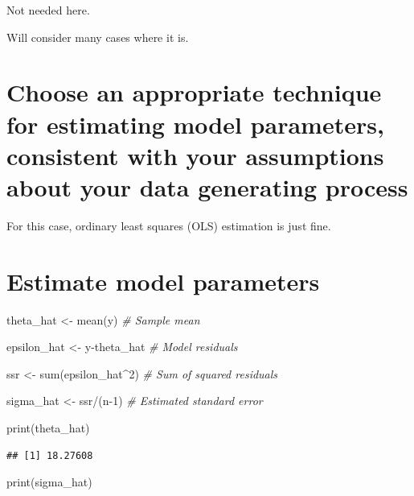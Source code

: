 \documentclass[
]{book}
\newenvironment{Shaded}{\begin{snugshade}}{\end{snugshade}}
\newcommand{\CommentTok}[1]{\textcolor[rgb]{0.56,0.35,0.01}{\textit{#1}}}
\newcommand{\DecValTok}[1]{\textcolor[rgb]{0.00,0.00,0.81}{#1}}
\newcommand{\FunctionTok}[1]{\textcolor[rgb]{0.00,0.00,0.00}{#1}}
\newcommand{\NormalTok}[1]{#1}
\newcommand{\OtherTok}[1]{\textcolor[rgb]{0.56,0.35,0.01}{#1}}
\newcommand{\SpecialCharTok}[1]{\textcolor[rgb]{0.00,0.00,0.00}{#1}}
\begin{document}
Not needed here.

Will consider many cases where it is.

\hypertarget{choose-an-appropriate-technique-for-estimating-model-parameters-consistent-with-your-assumptions-about-your-data-generating-process}{%
\section{Choose an appropriate technique for estimating model parameters, consistent with your assumptions about your data generating process}\label{choose-an-appropriate-technique-for-estimating-model-parameters-consistent-with-your-assumptions-about-your-data-generating-process}}

For this case, ordinary least squares (OLS) estimation is just fine.

\hypertarget{estimate-model-parameters}{%
\section{Estimate model parameters}\label{estimate-model-parameters}}

\begin{Shaded}
\begin{Highlighting}[]
\NormalTok{theta\_hat }\OtherTok{\textless{}{-}} \FunctionTok{mean}\NormalTok{(y)         }\CommentTok{\# Sample mean}

\NormalTok{epsilon\_hat }\OtherTok{\textless{}{-}}\NormalTok{ y}\SpecialCharTok{{-}}\NormalTok{theta\_hat   }\CommentTok{\# Model residuals}

\NormalTok{ssr }\OtherTok{\textless{}{-}} \FunctionTok{sum}\NormalTok{(epsilon\_hat}\SpecialCharTok{\^{}}\DecValTok{2}\NormalTok{)    }\CommentTok{\# Sum of squared residuals}

\NormalTok{sigma\_hat }\OtherTok{\textless{}{-}}\NormalTok{ ssr}\SpecialCharTok{/}\NormalTok{(n}\DecValTok{{-}1}\NormalTok{)       }\CommentTok{\# Estimated standard error}

\FunctionTok{print}\NormalTok{(theta\_hat)}
\end{Highlighting}
\end{Shaded}

\begin{verbatim}
## [1] 18.27608
\end{verbatim}

\begin{Shaded}
\begin{Highlighting}[]
\FunctionTok{print}\NormalTok{(sigma\_hat)}
\end{Highlighting}
\end{Shaded}
\end{document}
